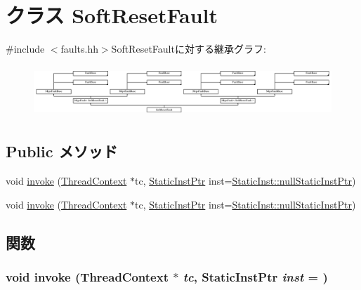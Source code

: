 \hypertarget{classMipsISA_1_1SoftResetFault}{
\section{クラス SoftResetFault}
\label{classMipsISA_1_1SoftResetFault}
}


{\ttfamily \#include $<$faults.hh$>$}SoftResetFaultに対する継承グラフ:\begin{figure}[H]
\begin{center}
\leavevmode
\includegraphics[height=1.94444cm]{classMipsISA_1_1SoftResetFault}
\end{center}
\end{figure}
\subsection*{Public メソッド}
\begin{DoxyCompactItemize}
\item 
void \hyperlink{classMipsISA_1_1SoftResetFault_a2bd783b42262278d41157d428e1f8d6f}{invoke} (\hyperlink{classThreadContext}{ThreadContext} $\ast$tc, \hyperlink{classRefCountingPtr}{StaticInstPtr} inst=\hyperlink{classStaticInst_aa793d9793af735f09096369fb17567b6}{StaticInst::nullStaticInstPtr})
\item 
void \hyperlink{classMipsISA_1_1SoftResetFault_a2bd783b42262278d41157d428e1f8d6f}{invoke} (\hyperlink{classThreadContext}{ThreadContext} $\ast$tc, \hyperlink{classRefCountingPtr}{StaticInstPtr} inst=\hyperlink{classStaticInst_aa793d9793af735f09096369fb17567b6}{StaticInst::nullStaticInstPtr})
\end{DoxyCompactItemize}


\subsection{関数}
\hypertarget{classMipsISA_1_1SoftResetFault_a2bd783b42262278d41157d428e1f8d6f}{
\subsubsection[{invoke}]{\setlength{\rightskip}{0pt plus 5cm}void invoke ({\bf ThreadContext} $\ast$ {\em tc}, \/  {\bf StaticInstPtr} {\em inst} = {})}}
\label{classMipsISA_1_1SoftResetFault_a2bd783b42262278d41157d428e1f8d6f}


